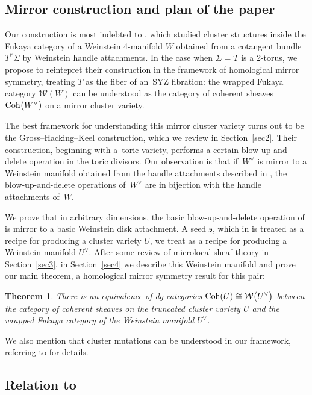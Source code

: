 \documentclass[10pt,a4paper]{amsart}
\numberwithin{equation}{section}
\def\cW{\mathcal{W}}
\newcommand\frs{\mathfrak{s}}
\newcommand{\Coh}{\textup{Coh}}
\newtheorem*{theorem*}{Theorem}
\begin{document}
\subsection{Mirror construction and plan of the paper}
Our construction is most indebted to \cite{STW}, which studied cluster structures inside the Fukaya category of a Weinstein 4-manifold $W$ obtained from a cotangent bundle $T^*\Sigma$ by Weinstein handle attachments. In the case when $\Sigma = T$ is a 2-torus, we propose to reintepret their construction in the framework of homological mirror symmetry, treating $T$ as the fiber of an~SYZ fibration: the wrapped Fukaya category $\cW(W)$ can be understood as the category of coherent sheaves $\Coh\big(W^\vee\big)$ on a mirror cluster variety.

The best framework for understanding this mirror cluster variety turns out to be the Gross--Hacking--Keel construction, which we review in Section~\ref{sec2}. Their construction, beginning with a~toric variety, performs a certain blow-up-and-delete operation in the toric divisors.
Our obser\-va\-tion is that if~$W^\vee$ is mirror to a Weinstein manifold obtained from the handle attachments described in \cite{STW}, the blow-up-and-delete operations of~$W^\vee$ are in bijection with the handle attachments of~$W$.

We prove that in arbitrary dimensions, the basic blow-up-and-delete operation of \cite{GHK2} is mirror to a basic Weinstein disk attachment.
A seed $\frs$, which in \cite{GHK2} is treated as a recipe for producing a cluster variety $U$, we treat as a recipe for producing a Weinstein manifold $U^\vee$.
After some review of microlocal sheaf theory in Section~\ref{sec3}, in Section~\ref{sec4} we describe this Weinstein manifold and prove our main theorem, a homological mirror symmetry result for this pair:
\begin{theorem*}
 There is an equivalence of dg categories $\Coh(U)\cong \cW\big(U^\vee\big)$ between the category of coherent sheaves on the truncated cluster variety $U$ and the wrapped Fukaya category of the Weinstein manifold $U^\vee$.
\end{theorem*}
We also mention that cluster mutations can be understood in our framework, referring to \cite{Nad-mut,PT,STW} for details.


\subsection[{Relation to [18]}]{Relation to \cite{HK20}}
\end{document}
